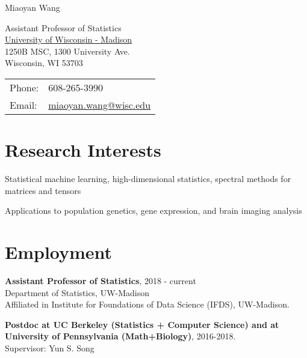 \documentclass[letterpaper]{article}
\def\name{Miaoyan Wang}
\renewenvironment{itemize}{
  \begin{list}{}{
    \setlength{\leftmargin}{1.5em}
  }
}{
  \end{list}
}
\begin{document}
{\huge \name}


\vspace{0.25in}

\begin{minipage}{0.45\linewidth}
Assistant Professor of Statistics\\
  \href{}{University of Wisconsin - Madison} \\
1250B MSC, 1300 University Ave.\\
Wisconsin, WI 53703\\

\end{minipage}
\begin{minipage}{0.45\linewidth}
  \begin{tabular}{ll}
    Phone: & 608-265-3990 \\
    Email: & \href{miaoyan.wang@wisc.edu}{miaoyan.wang@wisc.edu}\\
  \end{tabular}
\end{minipage}

\section*{Research Interests}
\begin{itemize}
\item Statistical machine learning, high-dimensional statistics, spectral methods for matrices and tensors 
\item Applications to population genetics, gene expression, and brain imaging analysis
\end{itemize}


\section*{Employment}
\begin{itemize}
\item {\bf Assistant Professor of Statistics}, 2018 - current\\
Department of Statistics, UW-Madison\\
Affiliated in Institute for Foundations of Data Science (IFDS), UW-Madison.

\item {\bf Postdoc at UC Berkeley (Statistics + Computer Science) and at University of Pennsylvania (Math+Biology)}, 2016-2018.\\
Supervisor: Yun S. Song

\end{itemize}
\end{document}
